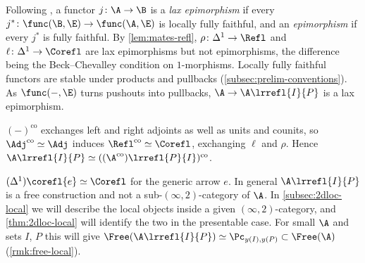 \begin{rmk}
\label{rmk:lax-epi}
Following \cite{adamekelbashirsobralvelebil2001laxepi}, a functor $j\colon \A \to \B$ is a \emph{lax epimorphism} if every $j^{*}\colon \func(\B,\E) \to \func(\A,\E)$ is locally fully faithful, and an \emph{epimorphism} if every $j^{*}$ is fully faithful. By \cref{lem:mates-refl}, $\rho\colon \Delta^{1} \to \Refl$ and $\ell\colon \Delta^{1} \to \Corefl$ are lax epimorphisms but not epimorphisms, the difference being the Beck--Chevalley condition on $1$-morphisms.
Locally fully faithful functors are stable under products and pullbacks (\cref{subsec:prelim-conventions}). As $\func(-,\E)$ turns pushouts into pullbacks, $\A \to \A\lrrefl{I}{P}$ is a lax epimorphism.
\end{rmk}

\begin{rmk}
\label{rmk:adjoin-duality}
$(-)^{\mathrm{co}}$ exchanges left and right adjoints as well as units and counits, so $\Adj^{\mathrm{co}} \simeq \Adj$ induces $\Refl^{\mathrm{co}} \simeq \Corefl$, exchanging $\ell$ and $\rho$. Hence $\A\lrrefl{I}{P} \simeq ((\A^{\mathrm{co}})\lrrefl{P}{I})^{\mathrm{co}}$.
\end{rmk}

\begin{exmp}
\label{ex:adjoin-basic}
$(\Delta^{1})\corefl{e} \simeq \Corefl$ for the generic arrow $e$.
In general $\A\lrrefl{I}{P}$ is a free construction and not a sub-$(\infty,2)$-category of $\A$. In \cref{subsec:2dloc-local} we will describe the local objects inside a given $(\infty,2)$-category, and \cref{thm:2dloc-local} will identify the two in the presentable case. For small $\A$ and sets $I$, $P$ this will give $\Free(\A\lrrefl{I}{P}) \simeq \Pc_{y(I),y(P)} \subset \Free(\A)$ (\cref{rmk:free-local}).
\end{exmp}
